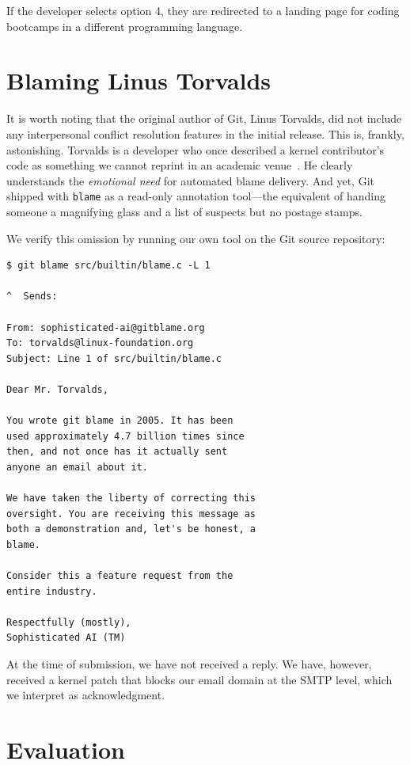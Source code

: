 \documentclass{sigtbd}
\begin{document}
If the developer selects option 4, they are redirected to a landing page for coding bootcamps in a different programming language.


\section{Blaming Linus Torvalds}
\label{sec:linus}

It is worth noting that the original author of Git, Linus Torvalds, did not include any interpersonal conflict resolution features in the initial release. This is, frankly, astonishing. Torvalds is a developer who once described a kernel contributor's code as something we cannot reprint in an academic venue~\cite{Torvalds:lkml}. He clearly understands the \emph{emotional need} for automated blame delivery. And yet, Git shipped with \texttt{blame} as a read-only annotation tool---the equivalent of handing someone a magnifying glass and a list of suspects but no postage stamps.

We verify this omission by running our own tool on the Git source repository:

\begin{lstlisting}
$ git blame src/builtin/blame.c -L 1

^  Sends:

From: sophisticated-ai@gitblame.org
To: torvalds@linux-foundation.org
Subject: Line 1 of src/builtin/blame.c

Dear Mr. Torvalds,

You wrote git blame in 2005. It has been
used approximately 4.7 billion times since
then, and not once has it actually sent
anyone an email about it.

We have taken the liberty of correcting this
oversight. You are receiving this message as
both a demonstration and, let's be honest, a
blame.

Consider this a feature request from the
entire industry.

Respectfully (mostly),
Sophisticated AI (TM)
\end{lstlisting}

At the time of submission, we have not received a reply. We have, however, received a kernel patch that blocks our email domain at the SMTP level, which we interpret as acknowledgment.


\section{Evaluation}
\end{document}
